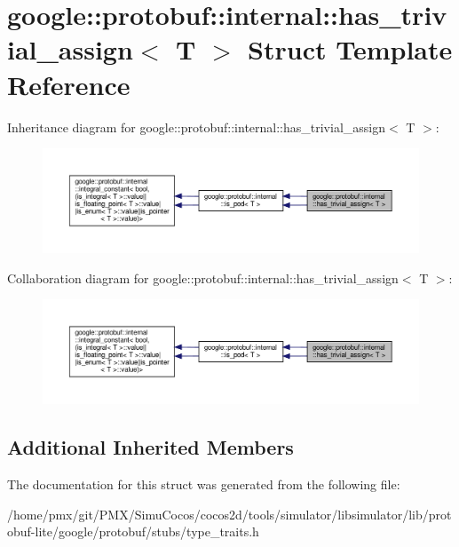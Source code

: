 \hypertarget{structgoogle_1_1protobuf_1_1internal_1_1has__trivial__assign}{}\section{google\+:\+:protobuf\+:\+:internal\+:\+:has\+\_\+trivial\+\_\+assign$<$ T $>$ Struct Template Reference}
\label{structgoogle_1_1protobuf_1_1internal_1_1has__trivial__assign}


Inheritance diagram for google\+:\+:protobuf\+:\+:internal\+:\+:has\+\_\+trivial\+\_\+assign$<$ T $>$\+:
\nopagebreak
\begin{figure}[H]
\begin{center}
\leavevmode
\includegraphics[width=350pt]{structgoogle_1_1protobuf_1_1internal_1_1has__trivial__assign__inherit__graph}
\end{center}
\end{figure}


Collaboration diagram for google\+:\+:protobuf\+:\+:internal\+:\+:has\+\_\+trivial\+\_\+assign$<$ T $>$\+:
\nopagebreak
\begin{figure}[H]
\begin{center}
\leavevmode
\includegraphics[width=350pt]{structgoogle_1_1protobuf_1_1internal_1_1has__trivial__assign__coll__graph}
\end{center}
\end{figure}
\subsection*{Additional Inherited Members}


The documentation for this struct was generated from the following file\+:\begin{DoxyCompactItemize}
\item 
/home/pmx/git/\+P\+M\+X/\+Simu\+Cocos/cocos2d/tools/simulator/libsimulator/lib/protobuf-\/lite/google/protobuf/stubs/type\+\_\+traits.\+h\end{DoxyCompactItemize}
